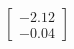 \documentclass[preview]{standalone}
\begin{document}
\begin{align*}
\begin{bmatrix} -2.12 \\ -0.04 \end{bmatrix}
\end{align*}
\end{document}
